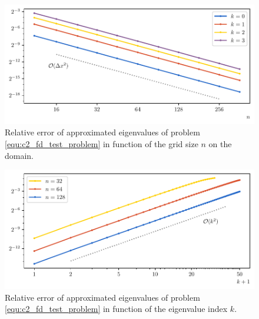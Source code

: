 \begin{figure}
    \begin{center}
        \includegraphics[width=\textwidth]{img/chapter2/finite_difference_h_error.pdf}
    \end{center}
    \caption{Relative error of approximated eigenvalues of problem \eqref{equ:c2_fd_test_problem} in function of the grid size $n$ on the domain.}
    \label{fig:c2_fd_h_error}
\end{figure}

\begin{figure}
    \begin{center}
        \includegraphics[width=\textwidth]{img/chapter2/finite_difference_k_error.pdf}
    \end{center}
    \caption{Relative error of approximated eigenvalues of problem \eqref{equ:c2_fd_test_problem} in function of the eigenvalue index $k$.}
    \label{fig:c2_fd_k_error}
\end{figure}

